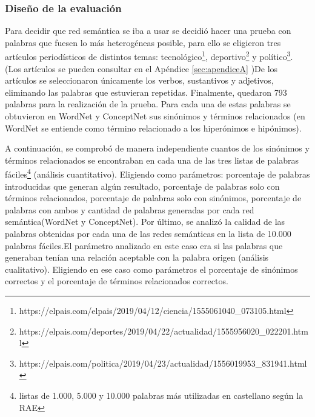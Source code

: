 \subsubsection{Diseño de la evaluación}
\label{cap:subsec:disenioeval}


Para decidir que red semántica se iba a usar se decidió hacer una prueba con palabras que fuesen lo más heterogéneas posible, para ello se eligieron tres artículos periodísticos de distintos temas: tecnológico\footnote{https://elpais.com/elpais/2019/04/12/ciencia/1555061040\_073105.html}, deportivo\footnote{https://elpais.com/deportes/2019/04/22/actualidad/1555956020\_022201.html} y político\footnote{https://elpais.com/politica/2019/04/23/actualidad/1556019953\_831941.html}. (Los artículos se pueden consultar en el Apéndice \ref{sec:apendiceA} )De los artículos se seleccionaron únicamente los verbos, sustantivos y adjetivos, eliminando las palabras que estuvieran repetidas. Finalmente, quedaron 793 palabras para la realización de la prueba. Para cada una de estas palabras se obtuvieron en WordNet y ConceptNet sus sinónimos y términos relacionados (en WordNet se entiende como término relacionado a los hiperónimos e hipónimos).

A continuación, se comprobó de manera independiente cuantos de los sinónimos y términos relacionados se encontraban en cada una de las tres listas de palabras fáciles\footnote{listas de 1.000, 5.000 y 10.000 palabras más utilizadas en castellano según la RAE} (análisis cuantitativo). Eligiendo como parámetros: porcentaje de palabras introducidas que generan algún resultado, porcentaje de palabras solo con términos relacionados, porcentaje de palabras solo con sinónimos, porcentaje de palabras con ambos y cantidad de palabras generadas por cada red semántica(WordNet y ConceptNet). Por último, se analizó la calidad de las palabras obtenidas por cada una de las redes semánticas en la lista de 10.000 palabras fáciles.El parámetro analizado en este caso era si las palabras que generaban tenían una relación aceptable con la palabra origen (análisis cualitativo). Eligiendo en ese caso como parámetros el porcentaje de sinónimos correctos y el porcentaje de términos relacionados correctos.

